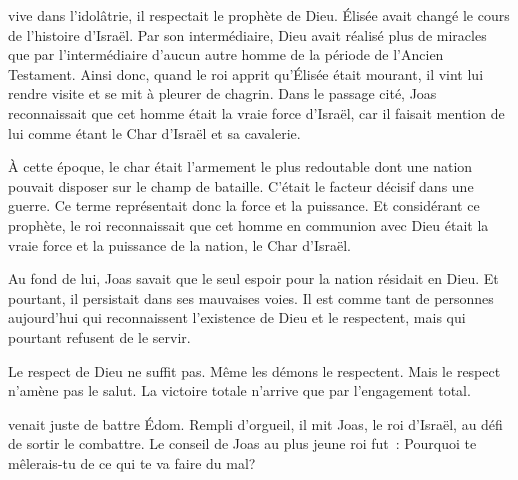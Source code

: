  vive dans l'idolâtrie,
 il respectait le prophète de Dieu.
 Élisée avait changé le cours de l'histoire d'Israël.
 Par son intermédiaire, Dieu avait réalisé plus de miracles
 que par l'intermédiaire d'aucun autre homme de la période
 de l'Ancien Testament.
 Ainsi donc, quand le roi apprit qu'Élisée était mourant,
 il vint lui rendre visite et se mit à pleurer de chagrin.
 Dans le passage cité, Joas reconnaissait que cet homme était
 la vraie force d'Israël, car il faisait mention de lui comme étant
 \og le Char d'Israël et sa cavalerie. \fg{}

À cette époque, le char était l'armement le plus redoutable
 dont une nation pouvait disposer sur le champ de bataille.
 C'était le facteur décisif dans une guerre.
 Ce terme représentait donc la force et la puissance.
 Et considérant ce prophète, le roi reconnaissait que cet homme
 en communion avec Dieu était la vraie force et la puissance
 de la nation, le \og Char d'Israël. \fg{}

Au fond de lui, Joas savait que le seul espoir pour la nation
 résidait en Dieu. Et pourtant, il persistait dans ses mauvaises voies.
 Il est comme tant de personnes aujourd'hui qui reconnaissent
 l'existence de Dieu et le respectent, mais qui pourtant refusent de le servir.


Le respect de Dieu ne suffit pas. Même les démons le respectent.
 Mais le respect n'amène pas le salut.
 La victoire totale n'arrive que par l'engagement total. 

\dvrule







 venait juste de battre Édom.
 Rempli d'orgueil, il mit Joas, le roi d'Israël,
 au défi de sortir le combattre.
 Le conseil de Joas au plus jeune roi fut~:
 \og Pourquoi te mêlerais-tu de ce qui te va faire du mal? \fg{}

